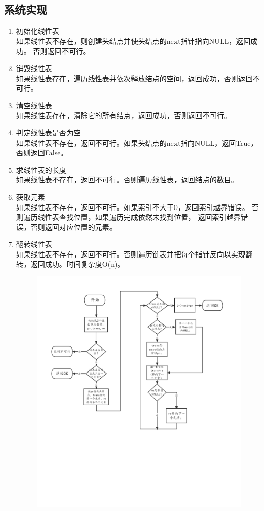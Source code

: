 \documentclass[supercite]{Experimental_Report}
\theoremstyle{definition}
\begin{document}
\subsection{系统实现}

\begin{enumerate}
	\item 初始化线性表\\
	如果线性表不存在，则创建头结点并使头结点的next指针指向NULL，返回成功。
	否则返回不可行。
	\item 销毁线性表\\
	如果线性表存在，遍历线性表并依次释放结点的空间，返回成功，否则返回不可行。
	\item 清空线性表\\
	如果线性表存在，清除它的所有结点，返回成功，否则返回不可行。
	\item 判定线性表是否为空\\
	如果线性表不存在，返回不可行。如果头结点的next指向NULL，返回True，
	否则返回False。
	\item 求线性表的长度\\
	如果线性表不存在，返回不可行。否则遍历线性表，返回结点的数目。
	\item 获取元素\\
	如果线性表不存在，返回不可行。如果索引不大于0，返回索引越界错误。
	否则遍历线性表查找位置，如果遍历完成依然未找到位置，
	返回索引越界错误，否则返回对应位置的元素。
	\item 翻转线性表\\
	如果线性表不存在，返回不可行。否则遍历链表并把每个指针反向以实现翻转，返回成功。时间复杂度O(n)。
	\begin{figure}[htb]
		\begin{center}
			\includegraphics[scale=0.60]{images/数据结构-链表-流程图.pdf}

\end{center}
\end{figure}
\end{enumerate}
\end{document}
